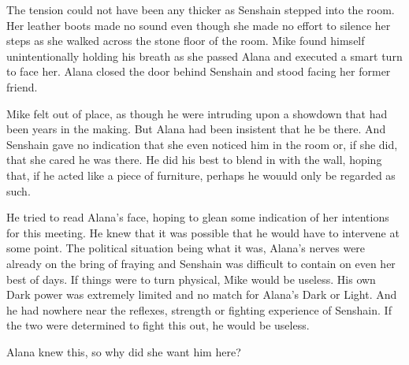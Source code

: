 The tension could not have been any thicker as Senshain stepped into the room.  Her leather boots made no sound even though she made no effort to silence her steps as she walked across the stone floor of the room.  Mike found himself unintentionally holding his breath as she passed Alana and executed a smart turn to face her.  Alana closed the door behind Senshain and stood facing her former friend.

Mike felt out of place, as though he were intruding upon a showdown that had been years in the making.  But Alana had been insistent that he be there.  And Senshain gave no indication that she even noticed him in the room or, if she did, that she cared he was there.  He did his best to blend in with the wall, hoping that, if he acted like a piece of furniture, perhaps he wouuld only be regarded as such.  

He tried to read Alana's face, hoping to glean some indication of her intentions for this meeting. He knew that it was possible that he would have to intervene at some point. The political situation being what it was, Alana's nerves were already on the bring of fraying and Senshain was difficult to contain on even her best of days.  If things were to turn physical, Mike would be useless.  His own Dark power was extremely limited and no match for Alana's Dark or Light.  And he had nowhere near the reflexes, strength or fighting experience of Senshain.  If the two were determined to fight this out, he would be useless.

Alana knew this, so why did she want him here?  
